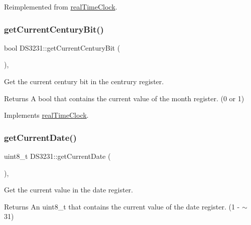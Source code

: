 Reimplemented from \mbox{\hyperlink{classreal_time_clock_a762441ffb1fbee666cd1642edfb8c929}{real\+Time\+Clock}}.

\mbox{\label{class_d_s3231_a38dfc1567d3419d5aeecd2062d4121c7}} 
\subsubsection{\texorpdfstring{get\+Current\+Century\+Bit()}{getCurrentCenturyBit()}}
{\footnotesize\ttfamily bool D\+S3231\+::get\+Current\+Century\+Bit (\begin{DoxyParamCaption}{ }\end{DoxyParamCaption})\hspace{0.3cm}{\ttfamily [override]}, {\ttfamily [virtual]}}



Get the current century bit in the centrury register. 

\begin{DoxyReturn}{Returns}
A bool that contains the current value of the month register. (0 or 1) 
\end{DoxyReturn}


Implements \mbox{\hyperlink{classreal_time_clock_ae0b15649f9135be8f0d9ada65084c28f}{real\+Time\+Clock}}.

\mbox{\label{class_d_s3231_a346341a4d3c6615103b33fbff7a12884}} 
\subsubsection{\texorpdfstring{get\+Current\+Date()}{getCurrentDate()}}
{\footnotesize\ttfamily uint8\+\_\+t D\+S3231\+::get\+Current\+Date (\begin{DoxyParamCaption}{ }\end{DoxyParamCaption})\hspace{0.3cm}{\ttfamily [override]}, {\ttfamily [virtual]}}



Get the current value in the date register. 

\begin{DoxyReturn}{Returns}
An uint8\+\_\+t that contains the current value of the date register. (1 -\/ $\sim$31) 
\end{DoxyReturn}



